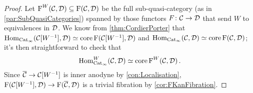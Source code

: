 \begin{proof}
	Let $\operatorname{F}^W(\mathcal{C},\mathcal{D})\subseteq\operatorname{F}(\mathcal{C},\mathcal{D})$ be the full sub-quasi-category (as in \cref{par:SubQuasiCategories}) spanned by those functors $F\colon \mathcal{C}\rightarrow\mathcal{D}$ that send $W$ to equivalences in $\mathcal{D}$. We know from \cref{thm:CordierPorter} that $\operatorname{Hom}_{\mathrm{Cat}_\infty}(\mathcal{C}[W^{-1}],\mathcal{D})\simeq \operatorname{core}\operatorname{F}(\mathcal{C}[W^{-1}],\mathcal{D})$ and $\operatorname{Hom}_{\mathrm{Cat}_\infty}(\mathcal{C},\mathcal{D})\simeq \operatorname{core}\operatorname{F}(\mathcal{C},\mathcal{D})$; it's then straightforward to check that
	\begin{equation*}
		\operatorname{Hom}_{\mathrm{Cat}_\infty}^W(\mathcal{C},\mathcal{D})\simeq \operatorname{core}\operatorname{F}^W(\mathcal{C},\mathcal{D})\,.
	\end{equation*}
	Since $\ov\Cc\rightarrow\Cc[W^{-1}]$ is inner anodyne by \cref{con:Localisation}, $\F(\Cc[W^{-1}],\Dd)\rightarrow\F(\ov\Cc,\Dd)$ is a trivial fibration by \cref{cor:FKanFibration}.
	

\end{proof}
